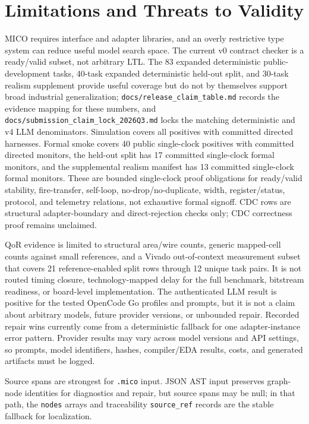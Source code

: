 \section{Limitations and Threats to Validity}

MICO requires interface and adapter libraries, and an overly restrictive type system can reduce useful model search space. The current v0 contract checker is a ready/valid subset, not arbitrary LTL. The 83 expanded deterministic public-development tasks, 40-task expanded deterministic held-out split, and 30-task realism supplement provide useful coverage but do not by themselves support broad industrial generalization; \texttt{docs/release\_claim\_table.md} records the evidence mapping for these numbers, and \texttt{docs/submission\_claim\_lock\_2026Q3.md} locks the matching deterministic and v4 LLM denominators. Simulation covers all positives with committed directed harnesses. Formal smoke covers 40 public single-clock positives with committed directed monitors, the held-out split has 17 committed single-clock formal monitors, and the supplemental realism manifest has 13 committed single-clock formal monitors. These are bounded single-clock proof obligations for ready/valid stability, fire-transfer, self-loop, no-drop/no-duplicate, width, register/status, protocol, and telemetry relations, not exhaustive formal signoff. CDC rows are structural adapter-boundary and direct-rejection checks only; CDC correctness proof remains unclaimed.

QoR evidence is limited to structural area/wire counts, generic mapped-cell counts against small references, and a Vivado out-of-context measurement subset that covers 21 reference-enabled split rows through 12 unique task pairs. It is not routed timing closure, technology-mapped delay for the full benchmark, bitstream readiness, or board-level implementation. The authenticated LLM result is positive for the tested OpenCode Go profiles and prompts, but it is not a claim about arbitrary models, future provider versions, or unbounded repair. Recorded repair wins currently come from a deterministic fallback for one adapter-instance error pattern. Provider results may vary across model versions and API settings, so prompts, model identifiers, hashes, compiler/EDA results, costs, and generated artifacts must be logged.

Source spans are strongest for \texttt{.mico} input. JSON AST input preserves graph-node identities for diagnostics and repair, but source spans may be null; in that path, the \texttt{nodes} arrays and traceability \texttt{source\_ref} records are the stable fallback for localization.
